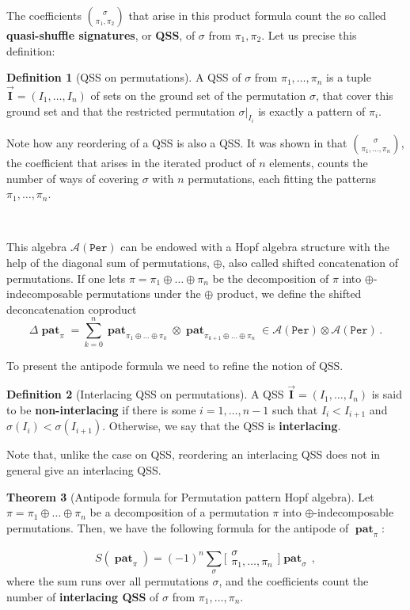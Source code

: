 \documentclass[12pt, reqno]{amsart}
\theoremstyle{definition}
\newtheorem{thm}{Theorem}[section]
\newtheorem{defin}[thm]{Definition}
\newcommand{\III}{\vec{\mathbf{I}}}
\DeclareMathOperator{\pat}{\mathbf{pat}}
\begin{document}
The coefficients $\binom{\sigma}{\pi_1, \pi_2}$ that arise in this product formula count the so called \textbf{quasi-shuffle signatures}, or \textbf{QSS}, of $\sigma$ from $\pi_1, \pi_2$.
Let us precise this definition:

\begin{defin}[QSS on permutations]
A QSS of $\sigma$ from $\pi_1, \dots, \pi_n$ is a tuple $\III = (I_1, \dots, I_n)$ of sets on the ground set of the permutation $\sigma$, that cover this ground set and that the restricted permutation $\sigma|_{I_i}$ is exactly a pattern of $\pi_i$.

Note how any reordering of a QSS is also a QSS.
It was shown in \cite{Penaguiao2020} that $\binom{\sigma}{\pi_1, \dots, \pi_n}$, the coefficient that arises in the iterated product of $n$ elements, counts the number of ways of covering $\sigma$ with $n$ permutations, each fitting the patterns $\pi_1, \dots, \pi_n$.
\end{defin}

\

This algebra $\mathcal A(\mathtt{Per})$ can be endowed with a Hopf algebra structure with the help of the diagonal sum of permutations, $\oplus$, also called shifted concatenation of permutations.
If one lets $\pi = \pi_1 \oplus \dots \oplus \pi_n$ be the decomposition of $\pi$ into $\oplus$-indecomposable permutations under the $\oplus$ product, we define the shifted deconcatenation coproduct
$$\Delta \pat_{\pi} = \sum_{k=0}^n \pat_{\pi_1\oplus \dots \oplus \pi_k} \otimes \pat_{\pi_{k+1}\oplus \dots \oplus \pi_n} \in \mathcal A (\mathtt{Per}) \otimes \mathcal A (\mathtt{Per})\, .$$

To present the antipode formula we need to refine the notion of QSS.
\begin{defin}[Interlacing QSS on permutations]
A QSS $\III = (I_1, \dots, I_n)$ is said to be \textbf{non-interlacing} if there is some $i=1, \dots, n-1$ such that $I_i < I_{i+1}$ and $\sigma(I_i) < \sigma(I_{i+1})$.
Otherwise, we say that the QSS is \textbf{interlacing}. 

Note that, unlike the case on QSS, reordering an interlacing QSS does not in general give an interlacing QSS.
\end{defin}


\begin{thm}[Antipode formula for Permutation pattern Hopf algebra]\label{thm:antipode_perms_intro}
Let $\pi = \pi_1\oplus \dots \oplus \pi_n$ be a decomposition of a permutation $\pi$ into $\oplus$-indecomposable permutations.
Then, we have the following formula for the antipode of $\pat_{\pi}$:

$$S(\pat_{\pi}) = (-1)^n \sum_{\sigma} \bigl[\!\begin{smallmatrix} \sigma \\ \pi_1, \dots, \pi_n \end{smallmatrix}\!\bigr] \pat_{\sigma}\, ,$$
where the sum runs over all permutations $\sigma$, and the coefficients count the number of \textbf{interlacing QSS} of $\sigma$ from $\pi_1, \dots, \pi_n$.
\end{thm}
\end{document}
